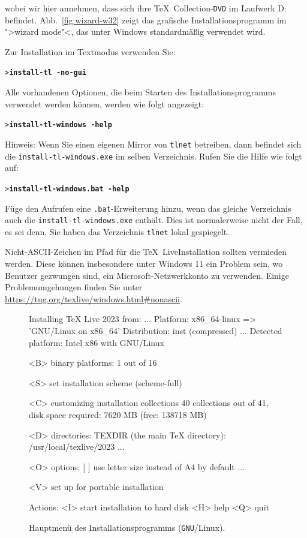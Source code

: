 \documentclass[12pt,ngerman,a4paper,fullparskip]{report}
\newcommand{\TL}{\TeX\ Live\xspace}
\newcommand{\acro}[1]{\texttt{#1}}
\newcommand{\dirname}[1]{\texttt{#1}}
\newcommand{\Ucom}[1]{\textbf{\texttt{#1}}}
\def\TK{\TeX\ Collection}
\providecommand*{\DVD}{\acro{DVD}\xspace}
\providecommand*{\GNU}{\acro{GNU}\xspace}
\begin{document}
wobei wir hier annehmen, dass sich ihre \TK-\DVD im Laufwerk D: befindet.
Abb.~\ref{fig:wizard-w32} zeigt das grafische Installationsprogramm im
">wizard mode"<, das unter Windows standardmäßig verwendet wird.

Zur Installation im Textmodus verwenden Sie:
\begin{alltt}
> \Ucom{install-tl -no-gui}
\end{alltt}

\noindent Alle vorhandenen Optionen, die beim Starten des Installationsprogramms verwendet werden können, werden
wie folgt angezeigt:

\begin{alltt}
> \Ucom{install-tl-windows -help}
\end{alltt}

Hinweis: Wenn Sie einen eigenen Mirror von \dirname{tlnet} betreiben, dann befindet sich die \texttt{install-tl-windows.exe} im selben Verzeichnis. Rufen Sie die Hilfe wie folgt auf:

\begin{alltt}
> \Ucom{install-tl-windows.bat -help}
\end{alltt}

Füge den Aufrufen eine \texttt{.bat}-Erweiterung hinzu, wenn das gleiche Verzeichnis auch die \texttt{install-tl-windows.exe} enthält. Dies ist normalerweise nicht der Fall, es sei denn, Sie haben das Verzeichnis \dirname{tlnet} lokal gespiegelt.

Nicht-ASCII-Zeichen im Pfad für die \TL\-Installation sollten vermieden werden. Diese können insbesondere unter Windows 11 ein Problem sein, wo Benutzer gezwungen sind, ein Microsoft-Netzwerkkonto zu verwenden. Einige Problemumgehungen finden Sie unter \url{https://tug.org/texlive/windows.html\#nonascii}.

\begin{figure}[tb]
\begin{boxedverbatim}
Installing TeX Live 2023 from: ...
Platform: x86_64-linux => 'GNU/Linux on x86_64'
Distribution: inst (compressed)
...
 Detected platform: Intel x86 with GNU/Linux
 
 <B> binary platforms: 1 out of 16

 <S> set installation scheme (scheme-full)

 <C> customizing installation collections
     40 collections out of 41, disk space required: 7620 MB (free: 138718 MB)

 <D> directories:
   TEXDIR (the main TeX directory):
     /usr/local/texlive/2023
   ...

 <O> options:
   [ ] use letter size instead of A4 by default
   ...
 
 <V> set up for portable installation

Actions:
 <I> start installation to hard disk
 <H> help
 <Q> quit
\end{boxedverbatim}
\caption{Hauptmenü des Installationsprogramms (\GNU/Linux).}\label{fig:text-main}
\end{figure}
\end{document}

